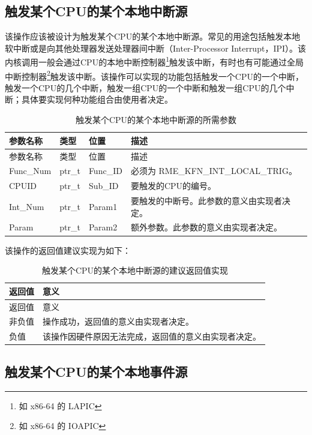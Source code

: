 \subsection{触发某个CPU的某个本地中断源}\label{subsec:8-trigger-local-interrupt-source}

该操作应该被设计为触发某个CPU的某个本地中断源。常见的用途包括触发本地软中断或是向其他处理器发送处理器间中断（Inter-Processor
Interrupt，IPI）。该内核调用一般会通过CPU的本地中断控制器\footnote{如 x86-64 的 LAPIC}触发该中断，有时也有可能通过全局中断控制器\footnote{如 x86-64 的 IOAPIC}触发该中断。该操作可以实现的功能包括触发一个CPU的一个中断，触发一个CPU的几个中断，触发一组CPU的一个中断和触发一组CPU的几个中断；具体要实现何种功能组合由使用者决定。

\begin{xltabular}{\textwidth}{@{}>{\hsize\raggedright\arraybackslash}X>{\hsize\raggedright\arraybackslash}X>{\hsize\raggedright\arraybackslash}X>{\hsize\raggedright\arraybackslash}X@{}}
\caption{触发某个CPU的某个本地中断源的所需参数}\label{tab:8-20-trigger-local-interrupt-source-parameters}\\
\toprule
参数名称 & 类型 & 位置 & 描述\tabularnewline
\endfirsthead
\toprule
参数名称 & 类型 & 位置 & 描述\tabularnewline
\midrule
\endhead
\bottomrule
\endlastfoot
Func\_Num & ptr\_t & Func\_ID & 必须为 RME\_KFN\_INT\_LOCAL\_TRIG。\tabularnewline
CPUID & ptr\_t & Sub\_ID & 要触发的CPU的编号。\tabularnewline
Int\_Num & ptr\_t & Param1 &
要触发的中断号。此参数的意义由实现者决定。\tabularnewline
Param & ptr\_t & Param2 &
额外参数。此参数的意义由实现者决定。\tabularnewline
\end{xltabular}

该操作的返回值建议实现为如下：

\begin{xltabular}{\textwidth}{@{}>{\hsize\raggedright\arraybackslash}X>{\hsize\raggedright\arraybackslash}X@{}}
\caption{触发某个CPU的某个本地中断源的建议返回值实现}\label{tab:8-21-trigger-local-interrupt-source-suggested-return-values}\\
\toprule
返回值 & 意义\tabularnewline
\endfirsthead
\toprule
返回值 & 意义\tabularnewline
\midrule
\endhead
\bottomrule
\endlastfoot
    非负值 & 操作成功，返回值的意义由实现者决定。\tabularnewline
    负值 & 该操作因硬件原因无法完成，返回值的意义由实现者决定。\tabularnewline
\end{xltabular}

\subsection{触发某个CPU的某个本地事件源}\label{subsec:8-trigger-local-event-source}

